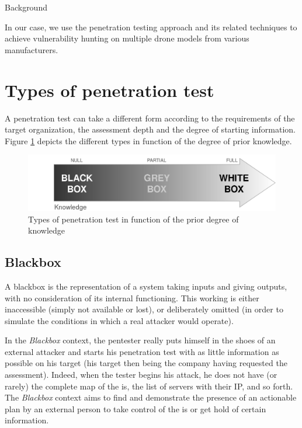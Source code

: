 \begin{chaptercover}{Background}
\begin{tip} 
In our case, we use the penetration testing approach and its related techniques to achieve vulnerability hunting on multiple drone models from various manufacturers.
\end{tip}

\section{Types of penetration test}

A penetration test can take a different form according to the requirements of the target organization, the assessment depth and the degree of starting information. Figure \ref{fig:pentest-types} depicts the different types in function of the degree of prior knowledge.

\begin{figure}[H]
  \centering
  \includegraphics[width=.7\linewidth]{figures/pentest-types}
  \caption{Types of penetration test in function of the prior degree of knowledge}
  \label{fig:pentest-types}
\end{figure}

\subsection{Blackbox}

A blackbox is the representation of a system taking inputs and giving outputs, with no consideration of its internal functioning. This working is either inaccessible (simply not available or lost), or deliberately omitted (in order to simulate the conditions in which a real attacker would operate).

In the \textit{Blackbox} context, the pentester really puts himself in the shoes of an external attacker and starts his penetration test with as little information as possible on his target (his target then being the company having requested the assessment). Indeed, when the tester begins his attack, he does not have (or rarely) the complete map of the \acrshort{is}, the list of servers with their IP, and so forth. The \textit{Blackbox} context aims to find and demonstrate the presence of an actionable plan by an external person to take control of the \acrshort{is} or get hold of certain information.


\end{chaptercover}
